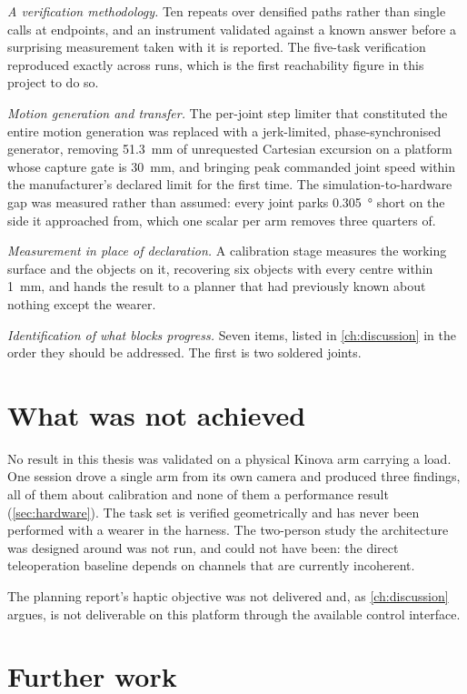 \emph{A verification methodology.} Ten repeats over densified paths rather
than single calls at endpoints, and an instrument validated against a known
answer before a surprising measurement taken with it is reported. The
five-task verification reproduced exactly across runs, which is the first
reachability figure in this project to do so.

\emph{Motion generation and transfer.} The per-joint step limiter that
constituted the entire motion generation was replaced with a jerk-limited,
phase-synchronised generator, removing \SI{51.3}{\milli\metre} of unrequested
Cartesian excursion on a platform whose capture gate is
\SI{30}{\milli\metre}, and bringing peak commanded joint speed within the
manufacturer's declared limit for the first time. The simulation-to-hardware
gap was measured rather than assumed: every joint parks \SI{0.305}{\degree}
short on the side it approached from, which one scalar per arm removes three
quarters of.

\emph{Measurement in place of declaration.} A calibration stage measures the
working surface and the objects on it, recovering six objects with every
centre within \SI{1}{\milli\metre}, and hands the result to a planner that had
previously known about nothing except the wearer.

\emph{Identification of what blocks progress.} Seven items, listed in
\cref{ch:discussion} in the order they should be addressed. The first is two
soldered joints.

\section{What was not achieved}

No result in this thesis was validated on a physical Kinova arm carrying a
load. One session drove a single arm from its own camera and produced three
findings, all of them about calibration and none of them a performance result
(\cref{sec:hardware}). The task set is verified geometrically and has never
been performed with a wearer in the harness. The two-person study
the architecture was designed around was not run, and could not have been:
the direct teleoperation baseline depends on channels that are currently
incoherent.

The planning report's haptic objective was not delivered and, as
\cref{ch:discussion} argues, is not deliverable on this platform through the
available control interface.

\section{Further work}


